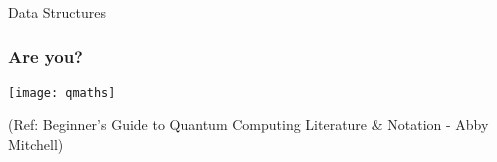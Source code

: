 \begin{frame}[fragile]\frametitle{}
\begin{center}
{\Large Data Structures}
\end{center}

\end{frame}


 \begin{frame}[fragile]\frametitle{Are you?}

\begin{center}
\texttt{[image: qmaths]}
\end{center}

\tiny{(Ref: Beginner’s Guide to Quantum Computing Literature \& Notation - Abby Mitchell)}

\end{frame}

